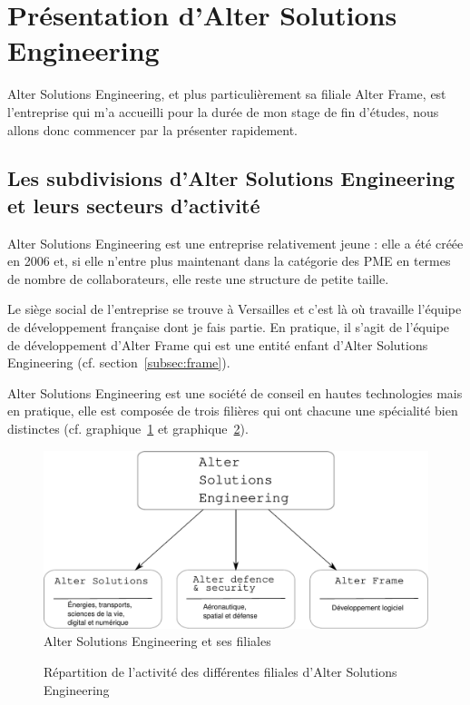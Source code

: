 \section{Présentation d'Alter Solutions Engineering}
Alter Solutions Engineering, et plus particulièrement sa filiale Alter Frame, est l'entreprise qui m'a accueilli pour la durée de mon stage de fin d'études, nous allons donc commencer par la présenter rapidement.

\subsection{Les subdivisions d'Alter Solutions Engineering et leurs secteurs d'activité}
Alter Solutions Engineering est une entreprise relativement jeune : elle a été créée en 2006 et, si elle n'entre plus maintenant dans la catégorie des PME en termes de nombre de collaborateurs, elle reste une structure de petite taille.

Le siège social de l'entreprise se trouve à Versailles et c'est là où travaille l'équipe de développement française dont je fais partie. En pratique, il s'agit de l'équipe de développement d'Alter Frame qui est une entité enfant d'Alter Solutions Engineering (cf. section~\ref{subsec:frame}).

Alter Solutions Engineering est une société de conseil en hautes technologies mais en pratique, elle est composée de trois filières qui ont chacune une spécialité bien distinctes (cf. graphique~\ref{fig:filiales} et graphique~\ref{fig:activite}).
\begin{figure}
	\centering
	\caption{Alter Solutions Engineering et ses filiales}
	\label{fig:filiales}
	\includegraphics[width=\textwidth]{images/filiales_allinone.pdf}
\end{figure}
\begin{figure}
	\caption{Répartition de l'activité des différentes filiales d'Alter Solutions Engineering}
	\label{fig:activite}
\end{figure}

